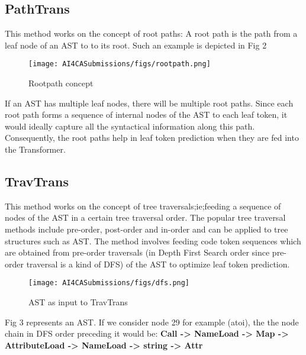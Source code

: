 \documentclass[sigplan,screen,9pt]{acmart}
\begin{document}
\subsection{PathTrans}
This method works on the concept of root paths: A root path is the path from a leaf node of an AST to to its root. Such an example is depicted in Fig 2
\begin{figure}[h]
  \centering
  \texttt{[image: AI4CASubmissions/figs/rootpath.png]}
  \caption{Rootpath concept}
\end{figure}
If an AST has multiple leaf nodes, there will be multiple root paths. Since each root path forms a sequence of internal nodes of the AST to each leaf token, it would ideally capture all the syntactical information along this path. Consequently, the root paths help in leaf token prediction when they are fed into the Transformer.
\subsection{TravTrans}
This method works on the concept of tree traversals;ie;feeding a sequence of nodes of the AST in a certain tree traversal order. The popular tree traversal methods include pre-order, post-order and in-order and can be applied to tree structures such as AST. The method involves feeding code token sequences which are obtained from pre-order traversals (in Depth First Search order since pre-order traversal is a kind of DFS) of the AST to optimize leaf token prediction.
\begin{figure}[h]
  \centering
  \texttt{[image: AI4CASubmissions/figs/dfs.png]}
  \caption{AST as input to TravTrans}
\end{figure}
Fig 3 represents an AST. If we consider node 29 for example (atoi), the the node chain in DFS order preceding it would be:
\newline
\textbf{Call -> NameLoad -> Map -> AttributeLoad -> NameLoad -> string -> Attr}
\end{document}
